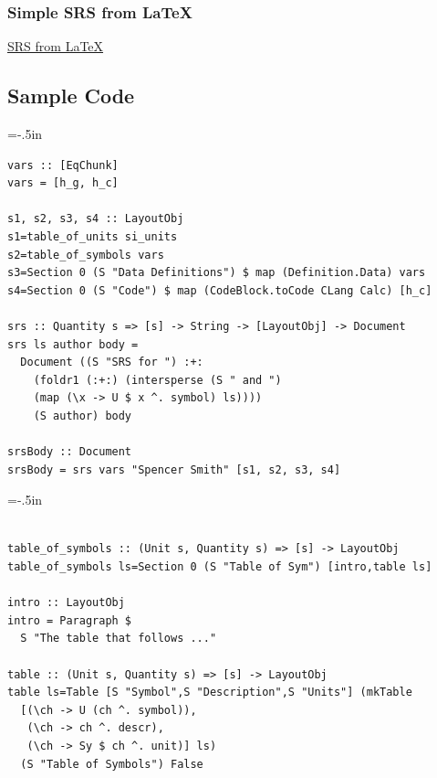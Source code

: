 \documentclass{beamer}
\begin{document}

\begin{frame}[fragile]

\frametitle{Simple SRS from LaTeX}

\href{run:SRS.pdf}{SRS from LaTeX}

\end{frame}


\subsection[Code]{Sample Code}


\hoffset=-.5in %

\begin{frame}


\begin{lstlisting}
vars :: [EqChunk]
vars = [h_g, h_c]

s1, s2, s3, s4 :: LayoutObj
s1=table_of_units si_units
s2=table_of_symbols vars
s3=Section 0 (S "Data Definitions") $ map (Definition.Data) vars
s4=Section 0 (S "Code") $ map (CodeBlock.toCode CLang Calc) [h_c]

srs :: Quantity s => [s] -> String -> [LayoutObj] -> Document
srs ls author body =
  Document ((S "SRS for ") :+: 
    (foldr1 (:+:) (intersperse (S " and ") 
    (map (\x -> U $ x ^. symbol) ls))))
    (S author) body  
  
srsBody :: Document
srsBody = srs vars "Spencer Smith" [s1, s2, s3, s4]
\end{lstlisting}
\end{frame}

\hoffset=0in %

\hoffset=-.5in %

\begin{frame}


\begin{lstlisting}

table_of_symbols :: (Unit s, Quantity s) => [s] -> LayoutObj
table_of_symbols ls=Section 0 (S "Table of Sym") [intro,table ls]

intro :: LayoutObj
intro = Paragraph $ 
  S "The table that follows ..."
  
table :: (Unit s, Quantity s) => [s] -> LayoutObj
table ls=Table [S "Symbol",S "Description",S "Units"] (mkTable
  [(\ch -> U (ch ^. symbol)), 
   (\ch -> ch ^. descr), 
   (\ch -> Sy $ ch ^. unit)] ls)
  (S "Table of Symbols") False

\end{lstlisting}
\end{frame}
\end{document}
